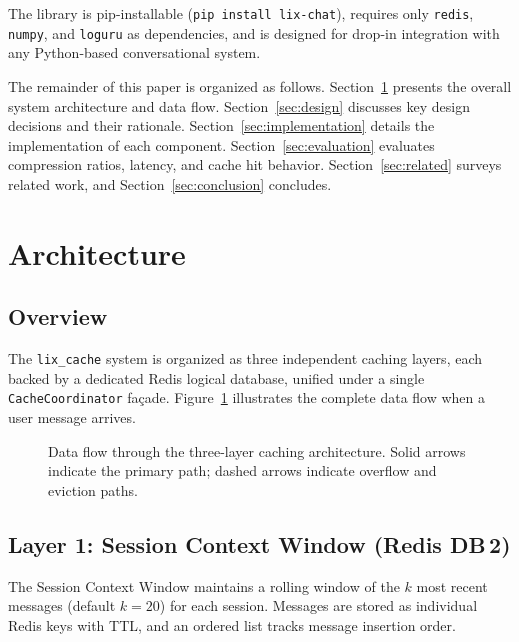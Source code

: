\documentclass[conference]{IEEEtran}
\begin{document}
The library is pip-installable (\texttt{pip install lix-chat}), requires only \texttt{redis}, \texttt{numpy}, and \texttt{loguru} as dependencies, and is designed for drop-in integration with any Python-based conversational system.

The remainder of this paper is organized as follows. Section~\ref{sec:architecture} presents the overall system architecture and data flow. Section~\ref{sec:design} discusses key design decisions and their rationale. Section~\ref{sec:implementation} details the implementation of each component. Section~\ref{sec:evaluation} evaluates compression ratios, latency, and cache hit behavior. Section~\ref{sec:related} surveys related work, and Section~\ref{sec:conclusion} concludes.

\section{Architecture}
\label{sec:architecture}

\subsection{Overview}

The \texttt{lix\_cache} system is organized as three independent caching layers, each backed by a dedicated Redis logical database, unified under a single \texttt{CacheCoordinator} fa\c{c}ade. Figure~\ref{fig:architecture} illustrates the complete data flow when a user message arrives.

\begin{figure}[t]
\centering

\caption{Data flow through the three-layer caching architecture. Solid arrows indicate the primary path; dashed arrows indicate overflow and eviction paths.}
\label{fig:architecture}
\end{figure}

\subsection{Layer 1: Session Context Window (Redis DB\,2)}

The Session Context Window maintains a rolling window of the $k$ most recent messages (default $k{=}20$) for each session. Messages are stored as individual Redis keys with TTL, and an ordered list tracks message insertion order.
\end{document}
